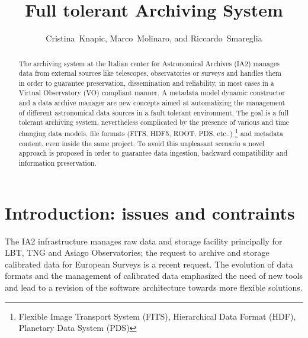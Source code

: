 
\resetcounters



\title{Full tolerant Archiving System}
\author{Cristina~Knapic, Marco~Molinaro, and Riccardo~Smareglia
}


\begin{abstract}
The archiving system at the Italian center for Astronomical Archives (IA2) manages
data from external sources like telescopes, observatories or surveys and handles
them in order to guarantee preservation, dissemination and reliability, in most
cases in a Virtual Observatory (VO) compliant manner. A metadata model dynamic
constructor and a data archive manager are new concepts aimed at automatizing the
management of different astronomical data sources in a fault tolerant environment.
The goal is a full tolerant archiving system, nevertheless complicated by the presence
of various and time changing data models, file formats (FITS, HDF5, ROOT, PDS, etc..)
\footnote{Flexible Image Transport System (FITS), Hierarchical Data Format (HDF), Planetary Data System (PDS)}
and metadata content, even inside the same project. To avoid this
unpleasant scenario a novel approach is proposed in order to guarantee data ingestion,
backward compatibility and information preservation.
\end{abstract}

\section{Introduction: issues and contraints}
The IA2 infrastructure manages raw data and storage facility principally
for LBT, TNG and Asiago Observatories; the request to archive and storage
calibrated data for European Surveys is a recent request. The evolution of
data formats and the management of calibrated data emphasized the need of
new tools and lead to a revision of the software architecture towards more
flexible solutions.

